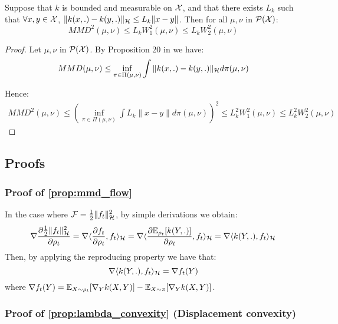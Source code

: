 \begin{lemma}\label{lem:mmd_w2}
	 Suppose that $k$ is bounded and measurable on ${{\mathcal X}}$, and that there exists $L_k$ such that $\forall x,y \in {{\mathcal X}}$, $\| k(x,.)-k(y,.) \|_{{{\mathcal H}}}\le L_k \|x-y\|$. Then for all $\mu, \nu$ in $\mathcal{P}({{\mathcal X}})$:
	\begin{equation}
	MMD^2(\mu,\nu)\le  L_k W_1^2(\mu,\nu) \le L_k W_2^2(\mu,\nu)
	\end{equation}
\end{lemma}
\begin{proof}
Let $\mu, \nu$ in $\mathcal{P}({{\mathcal X}})$. By Proposition 20 in \cite{sriperumbudur2010hilbert} we have:
\begin{equation}
	MMD(\mu, \nu)	 \le \inf_{\pi \in \Pi(\mu, \nu)} \int \| k(x,.)-k(y,.) \|_{{{\mathcal H}}} d\pi(\mu, \nu)
\end{equation}

Hence:
\begin{align}
	MMD^2(\mu, \nu)	
	 \le (\inf_{\pi \in \Pi(\mu, \nu)} \int L_k \| x-y \| d\pi(\mu, \nu))^2
 \le L_k^2 W_1^2(\mu, \nu) \le L_k^2 W_2^2(\mu,\nu)
\end{align}
\end{proof}

\subsection{Proofs}

\subsubsection{Proof of \cref{prop:mmd_flow}}

In the case where ${{\mathcal F}}= \frac{1}{2} \|f_t\|^2_{{{\mathcal H}}}$, by simple derivations we obtain:
\begin{equation}
 \nabla \frac{\partial\frac{1}{2} \|f_t\|^2_{{{\mathcal H}}}}{\partial \rho_t}= \nabla \langle \frac{\partial f_t}{\partial \rho_t}, f_t \rangle_{{{\mathcal H}}}= \nabla \langle \frac{\partial {{\mathbb E}}_{\rho_t}[k(Y,.)]}{\partial \rho_t}, f_t \rangle_{{{\mathcal H}}}= \nabla \langle k(Y,.), f_t \rangle_{{{\mathcal H}}}
\end{equation}
Then, by applying the reproducing property we have that:
\begin{equation}
\nabla \langle k(Y,.), f_t \rangle_{{{\mathcal H}}}
= \nabla f_t(Y)
\end{equation}
where $\nabla f_t(Y)= {{\mathbb E}}_{X \sim \rho_t}[\nabla_{Y}k(X,Y)] -  {{\mathbb E}}_{X \sim \pi}[\nabla_{Y}k(X,Y)]$.

\subsubsection{Proof of \cref{prop:lambda_convexity} (Displacement convexity)}


